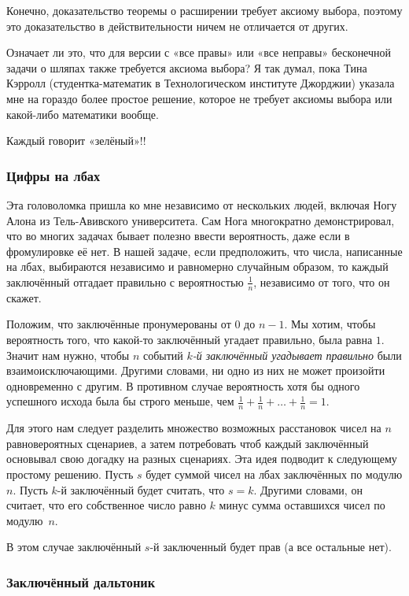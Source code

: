 Конечно, доказательство теоремы о расширении требует аксиому выбора, поэтому это доказательство в действительности ничем не отличается от других.

Означает ли это, что для версии с «все правы» или «все неправы» бесконечной задачи о шляпах также требуется аксиома выбора?
Я так думал, пока Тина Кэрролл (студентка-математик в Технологическом институте Джорджии) указала мне на гораздо более простое решение, которое не требует аксиомы выбора или какой-либо математики вообще.

Каждый говорит «зелёный»!!

\subsubsection*{Цифры на лбах}

Эта головоломка пришла ко мне независимо от нескольких людей, включая Ногу Алона из Тель-Авивского университета.
Сам Нога многократно демонстрировал, что во многих задачах бывает полезно ввести вероятность, даже если в фромулировке её нет.
В нашей задаче, если предположить, что числа, написанные на лбах, выбираются независимо и равномерно случайным образом, то каждый заключённый отгадает правильно с вероятностью $\tfrac1n$, независимо от того, что он скажет.

Положим, что заключённые пронумерованы от $0$ до $n-1$.
Мы хотим, чтобы вероятность того, что какой-то заключённый угадает правильно, была равна $1$.
Значит нам нужно, чтобы $n$ событий \emph{$k$-й заключённый угадывает правильно} были взаимоисключающими.
Другими словами, ни одно из них не может произойти одновременно с другим.
В противном случае вероятность хотя бы одного успешного исхода была бы строго меньше, чем $\tfrac1n + \tfrac1n + \dots + \tfrac1n = 1$.

Для этого нам следует разделить множество возможных расстановок чисел на $n$ равновероятных сценариев, а затем потребовать чтоб каждый заключённый основывал свою догадку на разных сценариях.
Эта идея подводит к следующему простому решению.
Пусть $s$ будет суммой чисел на лбах заключённых по модулю $n$.
Пусть $k$-й заключённый будет считать, что $s = k$.
Другими словами, он считает, что его собственное число равно $k$ минус сумма оставшихся чисел по модулю~$n$.

В этом случае заключённый $s$-й заключенный будет прав (а все остальные нет).

\subsubsection*{Заключённый дальтоник}

